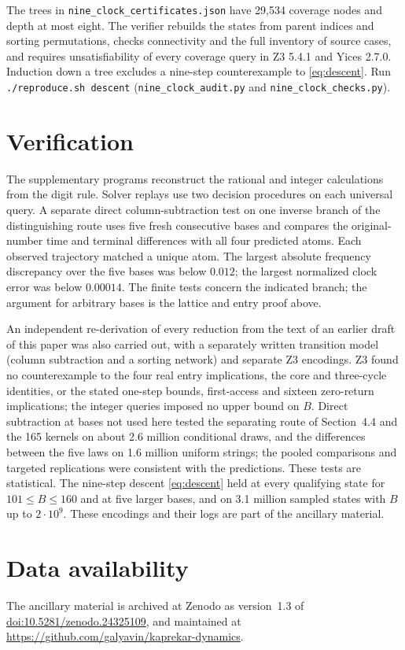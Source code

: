 \documentclass[11pt,reqno]{amsart}
\newcommand{\runcheck}[1]{\texttt{./reproduce.sh\ #1}}
\newcommand{\file}[1]{\nolinkurl{#1}}
\begin{document}
The trees in \file{nine_clock_certificates.json} have 29,534 coverage nodes
and depth at most eight. The verifier rebuilds the states from parent
indices and sorting permutations, checks connectivity and the full inventory
of source cases, and requires unsatisfiability of every coverage query
in Z3 5.4.1 and Yices 2.7.0. Induction down a tree excludes a nine-step
counterexample to \eqref{eq:descent}. Run \runcheck{descent}
(\file{nine_clock_audit.py} and \file{nine_clock_checks.py}).

\section*{Verification}
The supplementary programs reconstruct the rational and integer calculations
from the digit rule. Solver replays use two decision procedures on each
universal query. A separate direct column-subtraction test on one inverse
branch of the distinguishing route uses five fresh consecutive bases and
compares the original-number time and terminal differences with all four
predicted atoms. Each observed trajectory matched a unique atom. The largest
absolute frequency discrepancy over the five bases was below $0.012$; the
largest normalized clock error was below $0.00014$. The finite tests concern
the indicated branch; the argument
for arbitrary bases is the lattice and entry proof above.

An independent re-derivation of every reduction from the text of an earlier
draft of this paper was also carried out, with a separately written transition
model (column subtraction and a sorting network) and separate Z3 encodings.
Z3 found no counterexample to the four real entry implications, the core and
three-cycle identities, or the stated one-step bounds, first-access and sixteen
zero-return implications; the integer queries imposed no upper bound on $B$.
Direct subtraction at bases not used here tested the separating route of
Section~4.4 and the 165 kernels on about 2.6 million conditional draws, and
the differences between the five laws on 1.6 million uniform strings; the
pooled comparisons and targeted replications were consistent with the
predictions. These tests are statistical. The nine-step descent \eqref{eq:descent} held at every
qualifying state for $101\le B\le160$ and at five larger bases, and on
3.1 million sampled states with $B$ up to $2\cdot10^9$. These encodings and
their logs are part of the ancillary material.

\section*{Data availability}
The ancillary material is archived at Zenodo as version~1.3 of \href{https://doi.org/10.5281/zenodo.24325109}{doi:10.5281/zenodo.24325109}, and maintained at \url{https://github.com/galyavin/kaprekar-dynamics}.
\end{document}
